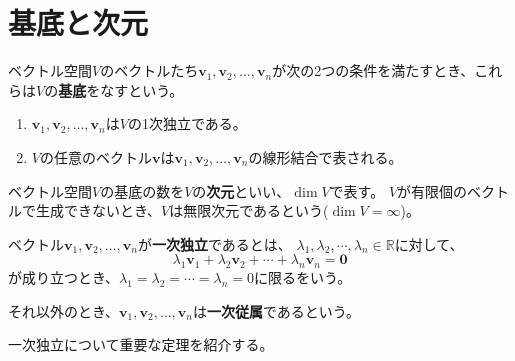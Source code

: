\documentclass{jlreq}
\begin{document}
\section{基底と次元}
\begin{definitionbox}[基底]
  ベクトル空間$V$のベクトルたち$\boldsymbol{v}_1, \boldsymbol{v}_2, \ldots, \boldsymbol{v}_n$が次の2つの条件を満たすとき、これらは$V$の\textbf{基底}をなすという。

  \begin{enumerate}
    \item $\boldsymbol{v}_1, \boldsymbol{v}_2, \ldots, \boldsymbol{v}_n$は$V$の1次独立である。
    \item $V$の任意のベクトル$\boldsymbol{v}$は$\boldsymbol{v}_1, \boldsymbol{v}_2, \ldots, \boldsymbol{v}_n$の線形結合で表される。
  \end{enumerate}
\end{definitionbox}

\begin{definitionbox}[次元]
  ベクトル空間$V$の基底の数を$V$の\textbf{次元}といい、$\dim V$で表す。
  $V$が有限個のベクトルで生成できないとき、$V$は無限次元であるという($\dim V = \infty$)。
\end{definitionbox}

\begin{definitionbox}[一次独立と一次従属]
  ベクトル$\boldsymbol{v}_1, \boldsymbol{v}_2, \ldots, \boldsymbol{v}_n$が\textbf{一次独立}であるとは、
  $\lambda_1, \lambda_2, \cdots, \lambda_n \in \mathbb{R}$に対して、
  \begin{equation*}
    \lambda_1 \boldsymbol{v}_1 + \lambda_2 \boldsymbol{v}_2 + \cdots + \lambda_n \boldsymbol{v}_n = \boldsymbol{0}
  \end{equation*}
  が成り立つとき、$\lambda_1 = \lambda_2 = \cdots = \lambda_n = 0$に限るをいう。

  それ以外のとき、$\boldsymbol{v}_1, \boldsymbol{v}_2, \ldots, \boldsymbol{v}_n$は\textbf{一次従属}であるという。
\end{definitionbox}

一次独立について重要な定理を紹介する。
\end{document}
